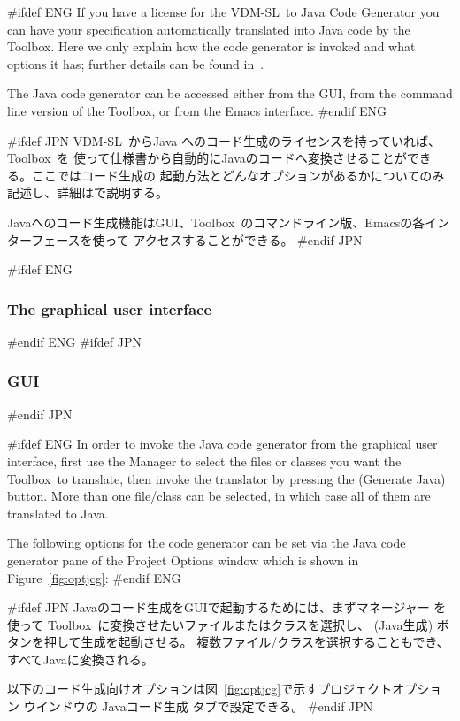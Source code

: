\documentclass[\pformat,12pt]{article}
\newcommand{\vdmslpp}{VDM-SL}
\newcommand{\Toolbox}{Toolbox}
\newcommand{\vdmslpp}{VDM++}
\newcommand{\Toolbox}{Toolbox}
\newcommand{\guicmd}[1]{{\sf #1}}
\newcommand{\guicmd}[1]{{\gt #1}}
\begin{document}
#ifdef ENG
If you have a license  for the \vdmslpp\ to Java
Code Generator you can have your specification automatically 
translated into Java code by the \Toolbox. Here we only explain how the
code generator is invoked and what options it has; further details can
be found in~\cite{CGJavaManPP-CSK}.

The Java code generator can be accessed either from the GUI, from the
command line version of the \Toolbox, or from the Emacs interface.
#endif ENG

#ifdef JPN
\vdmslpp\ からJava へのコード生成のライセンスを持っていれば、\Toolbox\ を
使って仕様書から自動的にJavaのコードへ変換させることができる。ここではコード生成の
起動方法とどんなオプションがあるかについてのみ記述し、詳細は\cite{CGJavaManPP-CSK}で説明する。

Javaへのコード生成機能はGUI、\Toolbox\ のコマンドライン版、Emacsの各インターフェースを使って
アクセスすることができる。
#endif JPN

#ifdef ENG
\subsubsection{The graphical user interface}
#endif ENG
#ifdef JPN
\subsubsection{GUI}
#endif JPN

#ifdef ENG
In order to invoke the Java code generator from the graphical user
interface, first use the \guicmd{Manager} to select the files or
classes you want
the \Toolbox\ to translate, then invoke the translator by pressing the 
(\guicmd{Generate Java}) button. More than one file/class can be
selected, in which case all of them are translated to Java.

The following options for the code generator can be set via the
\guicmd{Java code generator} pane of the \guicmd{Project Options} window
which is shown in Figure~\ref{fig:optjcg}:
#endif ENG

#ifdef JPN
Javaのコード生成をGUIで起動するためには、まず\guicmd{マネージャー} を使って
\Toolbox\ に変換させたいファイルまたはクラスを選択し、
(\guicmd{Java生成}) ボタンを押して生成を起動させる。
複数ファイル/クラスを選択することもでき、すべてJavaに変換される。

以下のコード生成向けオプションは図~\ref{fig:optjcg}で示す\guicmd{プロジェクトオプション} ウインドウの
\guicmd{Javaコード生成} タブで設定できる。
#endif JPN
\end{document}
